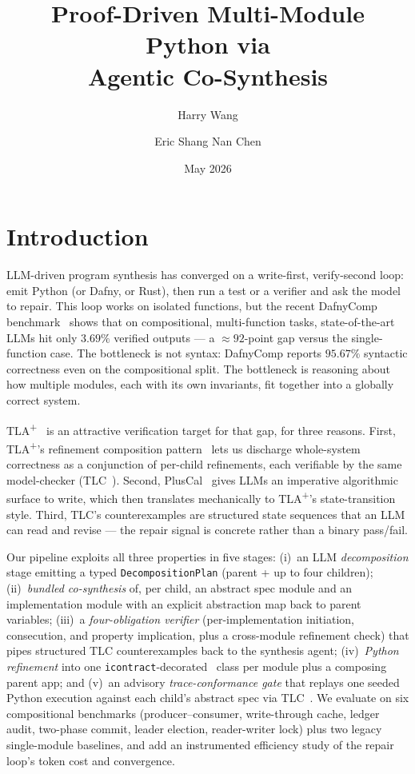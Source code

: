 \documentclass[11pt]{article}
\title{Proof-Driven Multi-Module Python via\\Agentic \TLA{} Co-Synthesis}
\author{Harry Wang \and Eric Shang Nan Chen}
\date{May 2026}
\newcommand{\TLA}{TLA\textsuperscript{+}}
\begin{document}
\maketitle

\section{Introduction}

LLM-driven program synthesis has converged on a write-first, verify-second
loop: emit Python (or Dafny, or Rust), then run a test or a verifier and ask
the model to repair. This loop works on isolated functions, but the recent
DafnyComp benchmark~\cite{dafnycomp2025} shows that on compositional, multi-function
tasks, state-of-the-art LLMs hit only $3.69\%$ verified outputs --- a
$\approx 92$-point gap versus the single-function case. The bottleneck is not
syntax: DafnyComp reports $95.67\%$ syntactic correctness even on the
compositional split. The bottleneck is reasoning about how multiple modules,
each with its own invariants, fit together into a globally correct system.

\TLA{}~\cite{lamport2002specifying} is an attractive verification target for
that gap, for three reasons. First, \TLA{}'s refinement composition
pattern~\cite{hillelwayne-tla-adt} lets us discharge whole-system correctness
as a conjunction of per-child refinements, each verifiable by the same
model-checker (TLC~\cite{yu1999tlc}). Second, PlusCal~\cite{lamport2009pluscal}
gives LLMs an imperative algorithmic surface to write, which then translates
mechanically to \TLA{}'s state-transition style. Third, TLC's counterexamples
are structured state sequences that an LLM can read and revise --- the repair
signal is concrete rather than a binary pass/fail.

Our pipeline exploits all three properties in five stages: (i)~an LLM
\emph{decomposition} stage emitting a typed \texttt{DecompositionPlan} (parent +
up to four children); (ii)~\emph{bundled co-synthesis} of, per child, an abstract
spec module and an implementation module with an explicit abstraction map back to
parent variables; (iii)~a \emph{four-obligation verifier} (per-implementation
initiation, consecution, and property implication, plus a cross-module refinement
check) that pipes structured TLC counterexamples back to the synthesis agent;
(iv)~\emph{Python refinement} into one \texttt{icontract}-decorated~\cite{icontract}
class per module plus a composing parent app; and (v)~an advisory
\emph{trace-conformance gate} that replays one seeded Python execution against each
child's abstract spec via TLC~\cite{cirstea2024}. We evaluate on six compositional
benchmarks (producer--consumer, write-through cache, ledger audit, two-phase
commit, leader election, reader-writer lock) plus two legacy single-module
baselines, and add an instrumented efficiency study of the repair loop's token
cost and convergence.
\end{document}
